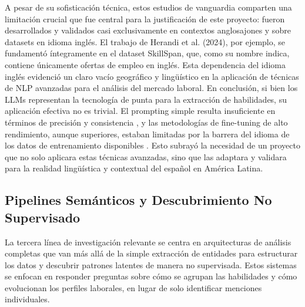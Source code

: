 A pesar de su sofisticación técnica, estos estudios de vanguardia comparten una limitación crucial que fue central para la justificación de este proyecto: fueron desarrollados y validados casi exclusivamente en contextos anglosajones y sobre datasets en idioma inglés. El trabajo de Herandi et al. (2024), por ejemplo, se fundamentó íntegramente en el dataset SkillSpan, que, como su nombre indica, contiene únicamente ofertas de empleo en inglés. Esta dependencia del idioma inglés evidenció un claro vacío geográfico y lingüístico en la aplicación de técnicas de NLP avanzadas para el análisis del mercado laboral. En conclusión, si bien los LLMs representan la tecnología de punta para la extracción de habilidades, su aplicación efectiva no es trivial. El prompting simple resulta insuficiente en términos de precisión y consistencia \parencite{nguyen2024}, y las metodologías de fine-tuning de alto rendimiento, aunque superiores, estaban limitadas por la barrera del idioma de los datos de entrenamiento disponibles \parencite{herandi2024}. Esto subrayó la necesidad de un proyecto que no solo aplicara estas técnicas avanzadas, sino que las adaptara y validara para la realidad lingüística y contextual del español en América Latina.

\subsection{Pipelines Semánticos y Descubrimiento No Supervisado}

La tercera línea de investigación relevante se centra en arquitecturas de análisis completas que van más allá de la simple extracción de entidades para estructurar los datos y descubrir patrones latentes de manera no supervisada. Estos sistemas se enfocan en responder preguntas sobre cómo se agrupan las habilidades y cómo evolucionan los perfiles laborales, en lugar de solo identificar menciones individuales.

